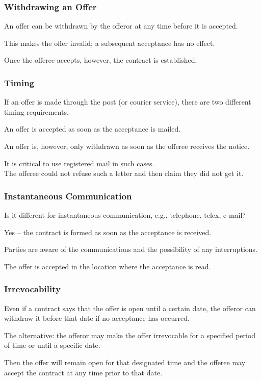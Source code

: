 \begin{frame}
\frametitle{Withdrawing an Offer}

An offer can be withdrawn by the offeror at any time before it is accepted.

This makes the offer invalid; a subsequent acceptance has no effect.

Once the offeree accepts, however, the contract is established.

\end{frame}



\begin{frame}
\frametitle{Timing}

If an offer is made through the post (or courier service), there are two different timing requirements.

An offer is accepted as soon as the acceptance is mailed.

An offer is, however, only withdrawn as soon as the offeree receives the notice.


It is critical to use registered mail in such cases.\\
\quad The offeree could not refuse such a letter and then claim they did not get it.

\end{frame}



\begin{frame}
\frametitle{Instantaneous Communication}

Is it different for instantaneous communication, e.g., telephone, telex, e-mail?

Yes -- the contract is formed as soon as the acceptance is received.

Parties are aware of the communications and the possibility of any interruptions.

The offer is accepted in the location where the acceptance is read.

\end{frame}




\begin{frame}
\frametitle{Irrevocability}

Even if a contract says that the offer is open until a certain date, the offeror can withdraw it before that date if no acceptance has occurred.

The alternative: the offeror may make the offer \alert{irrevocable} for a specified period of time or until a specific date.

Then the offer will remain open for that designated time and the offeree may accept the contract at any time prior to that date.

\end{frame}



